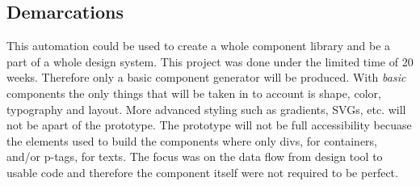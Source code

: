 \subsection{Demarcations}%
\label{sub:Demarcations}
This automation could be used to create a whole component library and be a part of a whole design system. This project was done under the limited time of 20 weeks. Therefore only a basic component generator will be produced. With \textit{basic} components the only things that will be taken in to account is shape, color, typography and layout. More advanced styling such as gradients, SVGs, etc. will not be apart of the prototype. The prototype will not be full accessibility becuase  the elements used to build the components where only divs, for containers, and/or p-tags, for texts.
The focus was on the data flow from design tool to usable code and therefore the component itself were not required to be perfect. 

